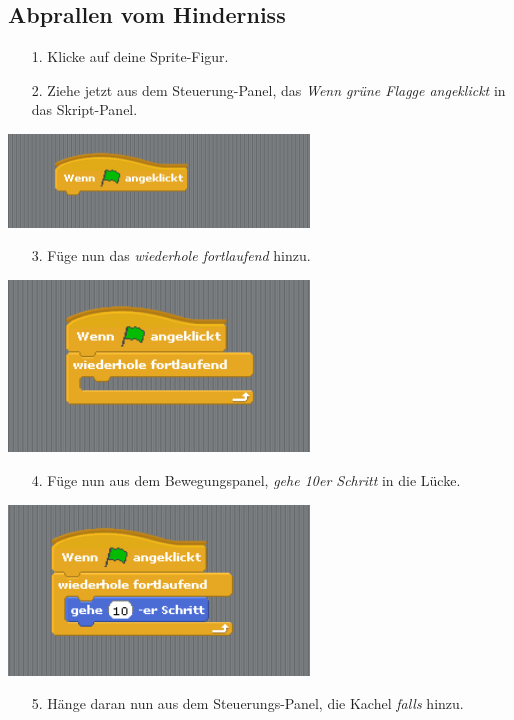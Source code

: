 \subsection{Abprallen vom Hinderniss}
\begin{itemize}
\item[1.] Klicke auf deine Sprite-Figur.
\item[2.] Ziehe jetzt aus dem Steuerung-Panel, das \textit{Wenn grüne Flagge angeklickt} in das Skript-Panel.
\end{itemize}
\includegraphics[width=0.6\textwidth]{images/aufgabe2_automat0.png}
\begin{itemize}
\item[3.] Füge nun das \textit{wiederhole fortlaufend} hinzu.
\end{itemize}
\includegraphics[width=0.6\textwidth]{images/aufgabe2_automat1.png}
\begin{itemize} 
\item[4.] Füge nun aus dem Bewegungspanel, \textit{gehe 10er Schritt} in die Lücke.
\end{itemize}
\includegraphics[width=0.6\textwidth]{images/aufgabe2_automat2.png}
\begin{itemize}
\item[5.] Hänge daran nun aus dem Steuerungs-Panel, die Kachel \textit{falls} hinzu.
\end{itemize}
